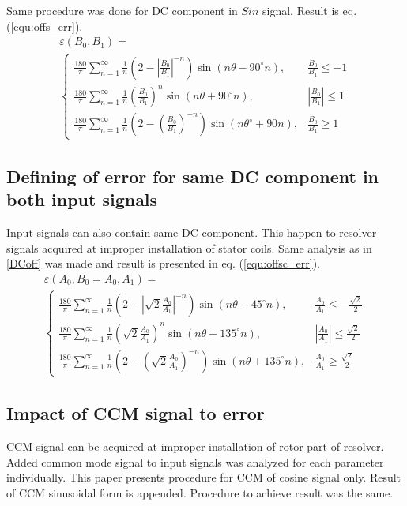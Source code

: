 \documentclass[a4paper]{article}
\begin{document}
Same procedure was done for DC component in $Sin$ signal. Result is eq. (\ref{equ:offs_err}).
\begin{multline}
\label{equ:offs_err}
\varepsilon(B_0, B_1)=\\
\begin{cases}
\frac{180}{\pi}\sum_{n=1}^{\infty}\frac{1}{n}(2-|\frac{B_0}{B_1}|^{-n}) \sin (n \theta -  90^\circ n), & \frac{B_0}{B_1}\leq -1 \\
\frac{180}{\pi}\sum_{n=1}^{\infty}\frac{1}{n}(\frac{B_0}{B_1})^n \sin (n \theta + 90^\circ n), & |\frac{B_0}{B_1}|\leq 1 \\
\frac{180}{\pi}\sum_{n=1}^{\infty}\frac{1}{n}(2-(\frac{B_0}{B_1})^{-n}) \sin (n \theta^\circ + 90 n), & \frac{B_0}{B_1}\geq 1
\end{cases}
\end{multline}

\subsection{Defining of error for same DC component in both input signals}
Input signals can also contain same DC component. This happen to resolver signals acquired at improper installation of stator coils. Same analysis as in \ref{DCoff} was made and result is presented in eq. (\ref{equ:offsc_err}).
\begin{multline}
\label{equ:offsc_err}
\varepsilon(A_0,B_0=A_0, A_1)=\\
\begin{cases}
\frac{180}{\pi}\sum_{n=1}^{\infty}\frac{1}{n}(2-|\sqrt{2}\frac{A_0}{A_1}|^{-n}) \sin (n \theta - 45^\circ n), & \frac{A_0}{A_1}\leq -\frac{\sqrt{2}}{2} \\
\frac{180}{\pi}\sum_{n=1}^{\infty}\frac{1}{n}(\sqrt{2}\frac{A_0}{A_1})^n \sin (n \theta + 135^\circ n), & |\frac{A_0}{A_1}|\leq \frac{\sqrt{2}}{2} \\
\frac{180}{\pi}\sum_{n=1}^{\infty}\frac{1}{n}(2-(\sqrt{2}\frac{A_0}{A_1})^{-n}) \sin (n \theta +135^\circ n), & \frac{A_0}{A_1}\geq \frac{\sqrt{2}}{2}
\end{cases}
\end{multline}

\subsection{Impact of CCM signal to error}
CCM signal can be acquired at improper installation of rotor part of resolver.
Added common mode signal to input signals was analyzed for each parameter individually. This paper presents procedure for CCM of cosine signal only. Result of CCM sinusoidal form is appended. Procedure to achieve result was the same.
\end{document}

